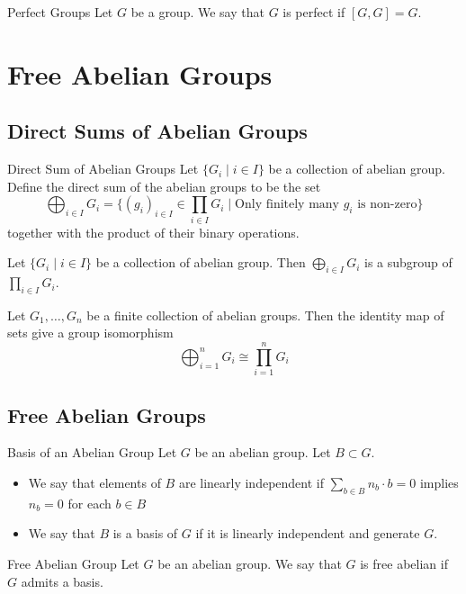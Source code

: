 \documentclass[a4paper]{article}
\begin{document}
\begin{defn}{Perfect Groups}{} Let $G$ be a group. We say that $G$ is perfect if $[G,G]=G$. 
\end{defn}

\pagebreak
\section{Free Abelian Groups}
\subsection{Direct Sums of Abelian Groups}
\begin{defn}{Direct Sum of Abelian Groups}{} Let $\{G_i\;|\;i\in I\}$ be a collection of abelian group. Define the direct sum of the abelian groups to be the set $$\bigoplus_{i\in I}G_i=\{(g_i)_{i\in I}\in\prod_{i\in I}G_i\;|\;\text{Only finitely many }g_i\text{ is non-zero}\}$$ together with the product of their binary operations. 
\end{defn}

\begin{lmm}{}{} Let $\{G_i\;|\;i\in I\}$ be a collection of abelian group. Then $\bigoplus_{i\in I}G_i$ is a subgroup of $\prod_{i\in I}G_i$. 
\end{lmm}

\begin{lmm}{}{} Let $G_1,\dots,G_n$ be a finite collection of abelian groups. Then the identity map of sets give a group isomorphism $$\bigoplus_{i=1}^nG_i\cong\prod_{i=1}^nG_i$$
\end{lmm}

\subsection{Free Abelian Groups}
\begin{defn}{Basis of an Abelian Group}{} Let $G$ be an abelian group. Let $B\subset G$. 
\begin{itemize}
\item We say that elements of $B$ are linearly independent if $\sum_{b\in B}n_b\cdot b=0$ implies $n_b=0$ for each $b\in B$
\item We say that $B$ is a basis of $G$ if it is linearly independent and generate $G$. 
\end{itemize}
\end{defn}

\begin{defn}{Free Abelian Group}{} Let $G$ be an abelian group. We say that $G$ is free abelian if $G$ admits a basis. 
\end{defn}
\end{document}
